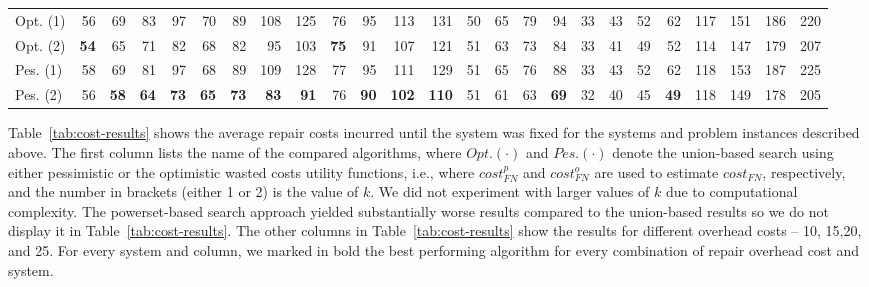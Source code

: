 \documentclass[letterpaper]{article}
\begin{document}
\begin{table*}[htb]
{\begin{tabular}{l|rrrr|rrrr|rrrr|rrrr|rrrr|rrrr}
Opt. (1) & 56       & 69       & 83       & 97       & 70       & 89       & 108      & 125      & 76       & 95       & 113       & 131       & 50       & 65       & 79       & 94       & 33       & 43       & 52       & 62       & 117      & 151       & 186       & 220       \\
Opt. (2) & {\bf 54} & 65       & 71       & 82       & 68       & 82       & 95       & 103      & {\bf 75} & 91       & 107       & 121       & 51       & 63       & 73       & 84       & 33       & 41       & 49       & 52       & 114      & 147       & 179       & 207       \\
Pes. (1) & 58       & 69       & 81       & 97       & 68       & 89       & 109      & 128      & 77       & 95       & 111       & 129       & 51       & 65       & 76       & 88       & 33       & 43       & 52       & 62       & 118      & 153       & 187       & 225       \\
Pes. (2) & 56       & {\bf 58} & {\bf 64} & {\bf 73} & {\bf 65} & {\bf 73} & {\bf 83} & {\bf 91} & 76       & {\bf 90} & {\bf 102} & {\bf 110} & 51       & 61       & 63       & {\bf 69} & 32       & 40       & 45       & {\bf 49} & 118      & 149       & 178       & 205      \\ \hline
\end{tabular}
}
\caption{Average repair costs until system is fixed.}
\label{tab:cost-results}
\end{table*}



Table~\ref{tab:cost-results} shows the average repair costs incurred until the system was fixed for the systems and problem instances described above.
The first column lists the name of the compared algorithms, where $Opt.(\cdot)$ and $Pes.(\cdot)$ denote the union-based search using either pessimistic or the optimistic wasted costs utility functions, i.e., where
 $cost_{FN}^p$ and $cost_{FN}^o$ are used to estimate $cost_{FN}$, respectively, and the number in brackets (either 1 or 2) is the value of $k$. We did not experiment with larger values of $k$ due to computational complexity. 
The powerset-based search approach yielded substantially worse results compared to the union-based results so we do not display it in Table~\ref{tab:cost-results}.
The other columns in Table~\ref{tab:cost-results} show the results for different overhead costs -- 10, 15,20, and 25. For every system and column, we marked in bold the best performing algorithm for every combination of repair overhead cost and system.
\end{document}
